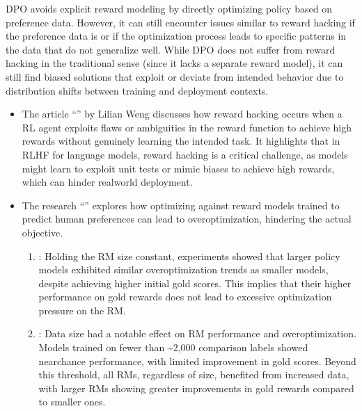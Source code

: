 \documentclass[letterpaper,11pt,english]{sphinxmanual}
\begin{document}
\sphinxAtStartPar
DPO avoids explicit reward modeling by directly optimizing policy based
on preference data. However, it can still encounter issues similar to
reward hacking if the preference data is  or if the
optimization process leads to  specific patterns in the
data that do not generalize well. While DPO does not suffer from reward
hacking in the traditional sense (since it lacks a separate reward
model), it can still find biased solutions that exploit
 or deviate from intended behavior due
to distribution shifts between training and deployment contexts.
\begin{itemize}
\item {} 
\sphinxAtStartPar
The article “”
by Lilian Weng discusses how reward hacking occurs when a RL agent
exploits flaws or ambiguities in the reward function to achieve high
rewards without genuinely learning the intended task. It highlights
that in RLHF for language models, reward hacking is a critical
challenge, as models might learn to exploit unit tests or mimic biases
to achieve high rewards, which can hinder real\sphinxhyphen{}world deployment.

\item {} 
\sphinxAtStartPar
The research “” explores how
optimizing against reward models trained to predict human preferences
can lead to overoptimization, hindering the actual objective.
\begin{enumerate}
%
\item {} 
\sphinxAtStartPar
{}: Holding the RM size constant,
experiments showed that larger policy models exhibited similar
overoptimization trends as smaller models, despite achieving higher
initial gold scores. This implies that their higher performance on
gold rewards does not lead to excessive optimization pressure on
the RM.

\item {} 
\sphinxAtStartPar
{}: Data size had a notable effect
on RM performance and overoptimization. Models trained on fewer
than \textasciitilde{}2,000 comparison labels showed near\sphinxhyphen{}chance performance, with
limited improvement in gold scores. Beyond this threshold, all RMs,
regardless of size, benefited from increased data, with larger RMs
showing greater improvements in gold rewards compared to smaller
ones.


\end{enumerate}
\end{itemize}
\end{document}

